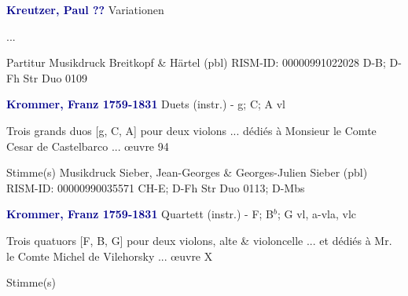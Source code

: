 \documentclass[twocolumn]{book}
\begin{document}
\newline \par \vspace{7pt} \textcolor{darkblue}{\textbf{Kreutzer, Paul  ??}}
\newline Variationen
\newline \begin{itshape}...\end{itshape} 
\newline \textcolor{darkblue}{}  Partitur
\newline Musikdruck
\newline Breitkopf \& Härtel  (pbl)
\newline RISM-ID: 00000991022028
\newline D-B; D-Fh  Str Duo 0109
\newline \par \vspace{7pt} \textcolor{darkblue}{\textbf{Krommer, Franz  1759-1831}}
\newline Duets (instr.) - g; C; A
 vl
\newline \begin{itshape}Trois grands duos [g, C, A] pour deux violons ... dédiés à Monsieur le Comte Cesar de Castelbarco ... œuvre 94\end{itshape} 
\newline \textcolor{darkblue}{}  Stimme(s)
\newline Musikdruck
\newline Sieber, Jean-Georges \& Georges-Julien Sieber  (pbl)
\newline RISM-ID: 00000990035571
\newline CH-E; D-Fh  Str Duo 0113; D-Mbs
\newline \par \vspace{7pt} \textcolor{darkblue}{\textbf{Krommer, Franz  1759-1831}}
\newline Quartett (instr.) - F; B$^b$; G
 vl, a-vla, vlc
\newline \begin{itshape}Trois quatuors [F, B, G] pour deux violons, alte \& violoncelle ... et dédiés à Mr. le Comte Michel de Vilehorsky ... œuvre X\end{itshape} 
\newline \textcolor{darkblue}{}  Stimme(s)
\end{document}
